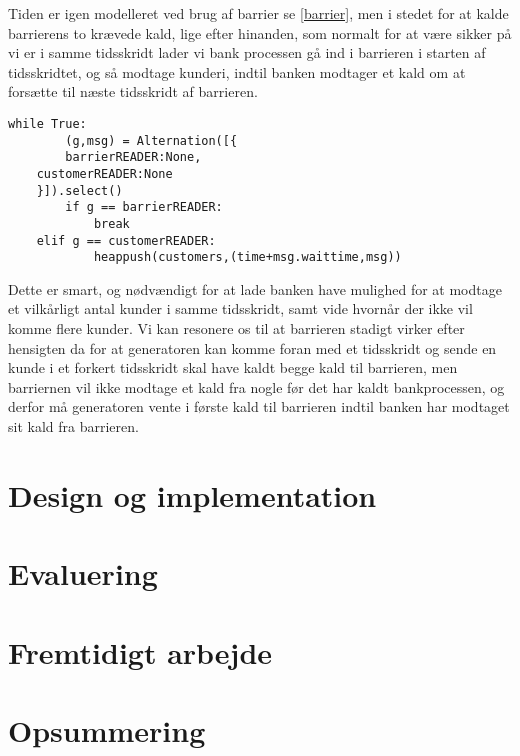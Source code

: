 Tiden er igen modelleret ved brug af barrier se \autoref{barrier}, men 
i stedet for  at kalde barrierens to krævede kald, lige efter hinanden, som 
normalt for at være sikker på vi er i samme tidsskridt lader vi bank
processen gå ind i barrieren i starten af tidsskridtet, og så modtage kunderi, 
indtil banken modtager et kald om at forsætte til næste tidsskridt af 
barrieren.
\begin{lstlisting}[label=bank-alternation-imp,caption=modtag kunder eller 
	barrier i Bankproces]
while True:
		(g,msg) = Alternation([{
		barrierREADER:None,
    customerREADER:None
    }]).select()
		if g == barrierREADER:
			break
    elif g == customerREADER:
			heappush(customers,(time+msg.waittime,msg))
\end{lstlisting}
Dette er smart, og nødvændigt for at lade banken have mulighed for at modtage 
et vilkårligt antal kunder i samme tidsskridt, samt vide hvornår der ikke vil  
komme flere kunder. Vi kan resonere os til at barrieren stadigt virker efter 
hensigten da for at generatoren kan komme foran med et tidsskridt og sende en 
kunde i et forkert tidsskridt skal have kaldt begge kald til barrieren, men 
barriernen vil ikke modtage et kald fra nogle før det har kaldt bankprocessen, 
og derfor må generatoren vente i første kald til barrieren indtil banken har 
modtaget sit kald fra barrieren. 

  \section{Design og implementation}
    
  \section{Evaluering}
  \section{Fremtidigt arbejde}
  \section{Opsummering}

